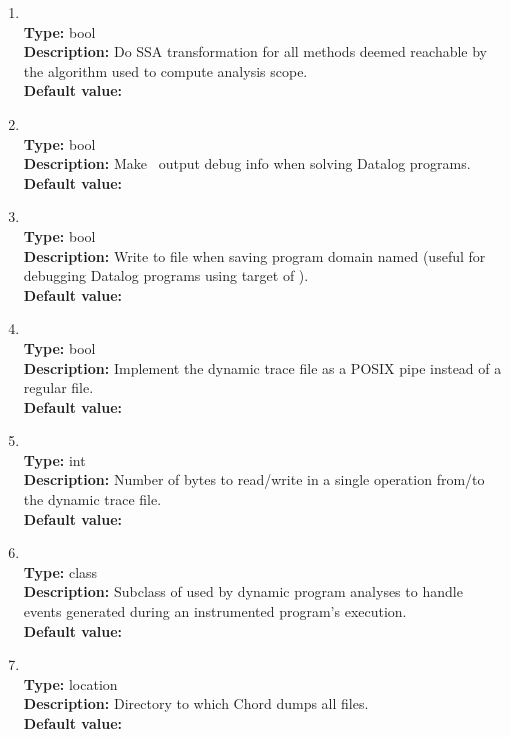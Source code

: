 \begin{enumerate}
\item
{} \\
{\bf Type:} bool \\
{\bf Description:} Do SSA transformation for all methods deemed reachable by the algorithm used to compute analysis scope. \\
{\bf Default value:}  

\item
{} \\
{\bf Type:} bool \\
{\bf Description:} Make \bddbddb\ output debug info when solving Datalog programs. \\
{\bf Default value:}  

\item
{} \\
{\bf Type:} bool \\
{\bf Description:} Write to file  when saving program domain named  (useful for debugging Datalog programs using  target of ). \\
{\bf Default value:}  

\item
{} \\
{\bf Type:} bool \\
{\bf Description:} Implement the dynamic trace file as a POSIX pipe instead of a regular file. \\
{\bf Default value:}  

\item
{} \\
{\bf Type:} int \\
{\bf Description:} Number of bytes to read/write in a single operation from/to the dynamic trace file. \\
{\bf Default value:}  

\item
{} \\
{\bf Type:} class \\
{\bf Description:} Subclass of  used by dynamic program analyses to handle events generated during an instrumented program's execution. \\
{\bf Default value:}  

\item
{} \\
{\bf Type:} location \\
{\bf Description:} Directory to which Chord dumps all files. \\
{\bf Default value:}  


\end{enumerate}
